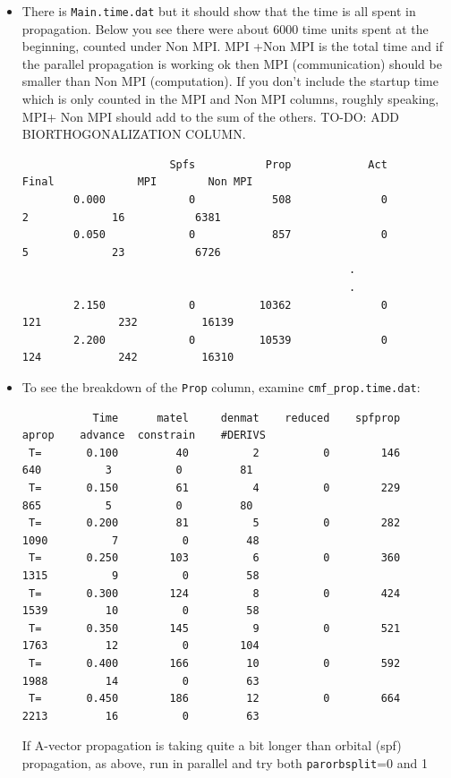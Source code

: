 \documentclass[10pt,leqno, oneside]{book}
\begin{document}
\begin{itemize}
%
\item{There is \verb#Main.time.dat# but it should show that the time is all spent
in propagation.  Below you see there were about 6000 time units spent at the beginning, counted under Non MPI.
MPI +Non MPI is the total time and if the parallel propagation is working ok then MPI (communication) should be smaller
than Non MPI (computation).  If you don't include the startup time which is only counted in the MPI and Non MPI columns,
roughly speaking,
MPI+ Non MPI should add to the sum of the others.  TO-DO: ADD BIORTHOGONALIZATION COLUMN.
%
{\footnotesize
\begin{verbatim}
                       Spfs           Prop            Act          Final             MPI        Non MPI
        0.000             0            508              0              2             16           6381
        0.050             0            857              0              5             23           6726
                                                   .
                                                   .
        2.150             0          10362              0            121            232          16139
        2.200             0          10539              0            124            242          16310
\end{verbatim}}       
}
%
\item{To see the breakdown of the \verb#Prop# column, examine \verb#cmf_prop.time.dat#:
{\footnotesize
\begin{verbatim}
           Time      matel     denmat    reduced    spfprop      aprop    advance  constrain    #DERIVS
 T=       0.100         40          2          0        146        640          3          0         81
 T=       0.150         61          4          0        229        865          5          0         80
 T=       0.200         81          5          0        282       1090          7          0         48
 T=       0.250        103          6          0        360       1315          9          0         58
 T=       0.300        124          8          0        424       1539         10          0         58
 T=       0.350        145          9          0        521       1763         12          0        104
 T=       0.400        166         10          0        592       1988         14          0         63
 T=       0.450        186         12          0        664       2213         16          0         63
\end{verbatim}}
If A-vector propagation is taking quite a bit longer than orbital (spf) propagation, as above, run in parallel and try both \verb#parorbsplit#=0 and 1
}
\end{itemize}
\end{document}
